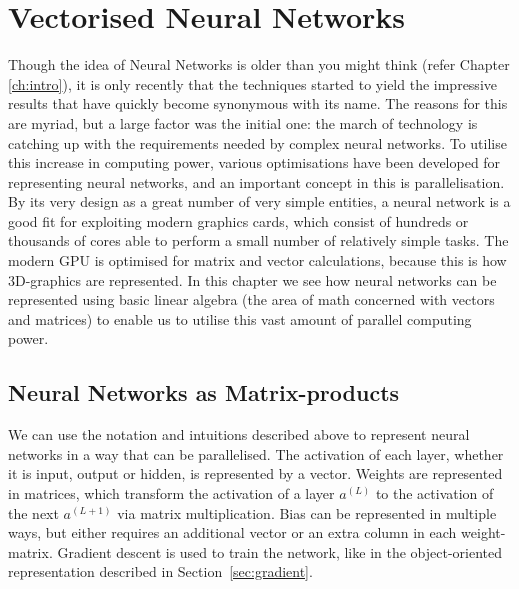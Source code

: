 \def\vec{\origvec}
\def\i#1{^{(#1)}}
\def\vec#1{\mid\! #1\rangle}

\chapter{Vectorised Neural Networks}\label{ch:opencl}

Though the idea of Neural Networks is older than you might think (refer Chapter \ref{ch:intro}), it is only recently that the techniques started to yield the impressive results that have quickly become synonymous with its name. The reasons for this are myriad, but a large factor was the initial one: the march of technology is catching up with the requirements needed by complex neural networks. To utilise this increase in computing power, various optimisations have been developed for representing neural networks, and an important concept in this is parallelisation. By its very design as a great number of very simple entities, a neural network is a good fit for exploiting modern graphics cards, which consist of hundreds or thousands of cores able to perform a small number of relatively simple tasks. The modern GPU is optimised for matrix and vector calculations, because this is how 3D-graphics are represented. In this chapter we see how neural networks can be represented using basic linear algebra (the area of math concerned with vectors and matrices) to enable us to utilise this vast amount of parallel computing power.

\section{Neural Networks as Matrix-products}\label{sec:nnmp}

We can use the notation and intuitions described above to represent neural networks in a way that can be parallelised. The activation of each layer, whether it is input, output or hidden, is represented by a vector. Weights are represented in matrices, which transform the activation of a layer $a\i L$ to the activation of the next $a^{(L+1)}$ via matrix multiplication. Bias can be represented in multiple ways, but either requires an additional vector or an extra column in each weight-matrix. Gradient descent is used to train the network, like in the object-oriented representation described in Section~\ref{sec:gradient}.

